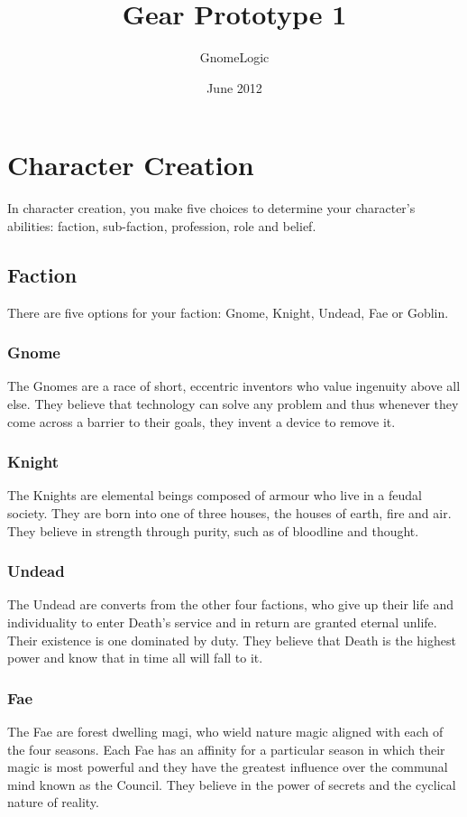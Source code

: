 \documentclass{report}
\begin{document}
\title{Gear Prototype 1}
\author{GnomeLogic}
\date{June 2012}
\maketitle

\chapter{Character Creation}
In character creation, you make five choices to determine your character's abilities: faction, sub-faction, profession,
role and belief.

\section{Faction}
There are five options for your faction: Gnome, Knight, Undead, Fae or Goblin.

\subsection{Gnome}
The Gnomes are a race of short, eccentric inventors who value ingenuity above all else. They believe that technology can
solve any problem and thus whenever they come across a barrier to their goals, they invent a device to remove it.

\subsection{Knight}
The Knights are elemental beings composed of armour who live in a feudal society. They are born into one of three houses,
the houses of earth, fire and air. They believe in strength through purity, such as of bloodline and thought.

\subsection{Undead}
The Undead are converts from the other four factions, who give up their life and individuality to enter Death's service and
in return are granted eternal unlife. Their existence is one dominated by duty. They believe that Death is the highest
power and know that in time all will fall to it.

\subsection{Fae}
The Fae are forest dwelling magi, who wield nature magic aligned with each of the four seasons. Each Fae has an affinity
for a particular season in which their magic is most powerful and they have the greatest influence over the communal mind
known as the Council. They believe in the power of secrets and the cyclical nature of reality.
\end{document}

